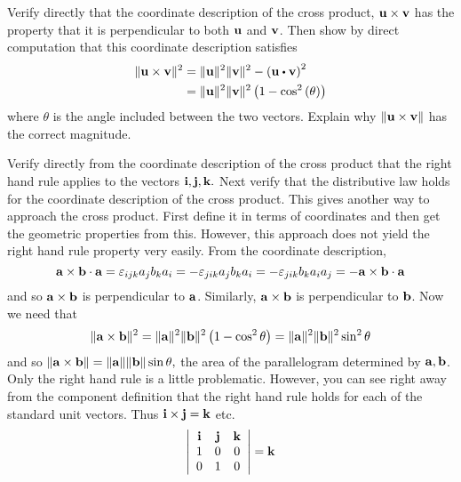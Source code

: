 \begin{enumialphparenastyle}
\begin{ex} Verify directly that the coordinate description of the cross product, 
${\bf u}\times {\bf v}$ has the property that it is perpendicular to both 
${\bf u}$ and ${\bf v}$. Then show by direct computation that this
coordinate description satisfies
\begin{align*}
\vectlength \vect{u}\times \vect{v}\vectlength ^{2}& =\vectlength \vect{u}
\vectlength ^{2}\vectlength \vect{v}\vectlength ^{2}-\left( \vect{u}\dotprod \vect{v}\right) ^{2} \\
& =\vectlength \vect{u}\vectlength ^{2}\vectlength \vect{v}\vectlength
^{2}\left( 1-\cos ^{2}\left( \theta \right) \right)
\end{align*}
where $\theta $ is the angle included between the two vectors. Explain why 
$\| {\bf u}\times {\bf v}\| $ has the correct magnitude.
\begin{sol}
Verify directly from the coordinate description of the cross product that the right hand rule applies to the vectors ${\bf i},{\bf j},{\bf k}.$ Next verify that the
distributive law holds for the coordinate description of the cross product.
This gives another way to approach the cross product. First define it in
terms of coordinates and then get the geometric properties from this.
However, this approach does not yield the right hand rule property very
easily. From the coordinate description,
\[
{\bf a}\times {\bf b}\cdot {\bf a}=\varepsilon _{ijk}a_{j}b_{k}a_{i}=-\varepsilon
_{jik}a_{j}b_{k}a_{i}=-\varepsilon _{jik}b_{k}a_{i}a_{j}=-{\bf a}\times
{\bf b}\cdot {\bf a}
\]
and so ${\bf a}\times {\bf b}$ is perpendicular to ${\bf a}$. Similarly, $
{\bf a}\times {\bf b}$ is perpendicular to ${\bf b}$. Now we need that 
\[
\| {\bf a}\times {\bf b}\| ^{2}=\| {\bf a}
\| ^{2}\| {\bf b}\| ^{2}\left( 1-\cos
^{2}\theta \right) =\| {\bf a}\| ^{2}\| {\bf b
}\| ^{2}\sin ^{2}\theta
\]
and so $\| {\bf a}\times {\bf b}\| =\| {\bf a}
\| \| {\bf b}\| \sin \theta ,$ the area of the
parallelogram determined by ${\bf a},{\bf b}$. Only the right hand rule is a
little problematic. However, you can see right away from the component
definition that the right hand rule holds for each of the standard unit
vectors. Thus ${\bf i}\times {\bf j}={\bf k}$ etc.
\[
\left\vert
\begin{array}{ccc}
{\bf i} & {\bf j} & {\bf k} \\
1 & 0 & 0 \\
0 & 1 & 0
\end{array}
\right\vert ={\bf k}
\]
\end{sol}
\end{ex}


\end{enumialphparenastyle}